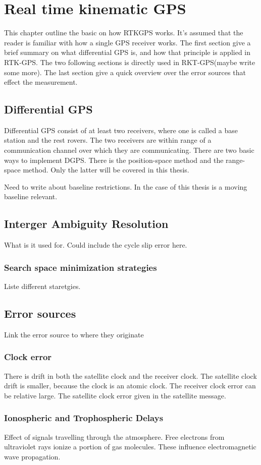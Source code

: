 
\chapter{Real time kinematic GPS}
This chapter outline the basic on how RTKGPS works. It's assumed that the reader is familiar with how a single GPS receiver works. The first section give a brief summary on what differential GPS is, and how that principle is applied in RTK-GPS. The two following sections is directly used in RKT-GPS(maybe write some more). The last section give a quick overview over the error sources that effect the measurement.
\section{Differential GPS}
Differential GPS consist of at least two receivers, where one is called a base station and the rest rovers. The two receivers are within range of a communication channel over which they are communicating. There are two basic ways to implement DGPS. There is the position-space method and the range-space method. Only the latter will be covered in this thesis.

Need to write about baseline restrictions. In the case of this thesis is a moving baseline relevant. 
\section{Interger Ambiguity Resolution}
What is it used for. Could include the cycle slip error here.
\subsection{Search space minimization strategies}
Liste different staretgies.
\section{Error sources}
Link the error source to where they originate
\subsection{Clock error}
There is drift in both the satellite clock and the receiver clock. The satellite clock drift is smaller, because the clock is an atomic clock. The receiver clock error can be relative large. The satellite clock error given in the satellite message. 
\subsection{Ionospheric and Trophospheric Delays}
Effect of signals travelling through the atmosphere. Free electrons from ultraviolet rays ionize a portion of gas molecules. These influence electromagnetic wave propagation.

